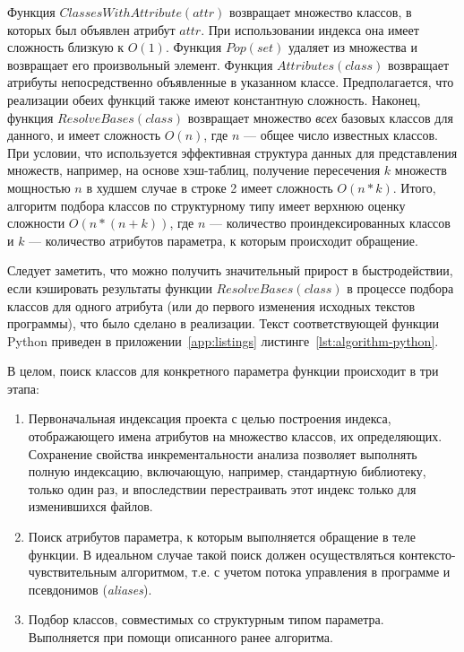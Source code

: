 Функция $ClassesWithAttribute(attr)$ возвращает множество классов, в
которых был объявлен атрибут $attr$. При использовании индекса она
имеет сложность близкую к $O(1)$. Функция $Pop(set)$ удаляет из множества
и возвращает его произвольный элемент. Функция $Attributes(class)$ возвращает
атрибуты непосредственно объявленные в указанном классе. Предполагается, что
реализации обеих функций также имеют константную сложность. Наконец, функция
$ResolveBases(class)$ возвращает множество \emph{всех} базовых классов для
данного, и имеет сложность $O(n)$, где $n$ --- общее число известных классов.
При условии, что используется эффективная структура данных для представления
множеств, например, на основе хэш-таблиц, получение пересечения $k$ множеств
мощностью $n$ в худшем случае в строке 2 имеет сложность $O(n*k)$.  Итого,
алгоритм подбора классов по структурному типу имеет верхнюю оценку сложности
$O(n* (n + k))$, где $n$ --- количество проиндексированных классов и $k$ ---
количество атрибутов параметра, к которым происходит обращение.

Следует заметить, что можно получить значительный прирост в быстродействии, если
кэшировать результаты функции $ResolveBases(class)$ в процессе подбора классов
для одного атрибута (или до первого изменения исходных текстов программы), что
было сделано в реализации. Текст соответствующей функции Python приведен в
приложении~\ref{app:listings} листинге~\ref{lst:algorithm-python}.


В целом, поиск классов для конкретного параметра функции происходит в три этапа:

\begin{enumerate}
  \item Первоначальная индексация проекта с целью построения
    индекса, отображающего имена атрибутов на множество классов, их определяющих.
    Сохранение свойства инкрементальности анализа позволяет выполнять полную
    индексацию, включающую, например, стандартную библиотеку, только один раз,
    и впоследствии перестраивать этот индекс только для изменившихся файлов.

  \item Поиск атрибутов параметра, к которым выполняется обращение в теле
    функции. В идеальном случае такой поиск должен осуществляться
    контексто-чувствительным алгоритмом, т.е. с учетом потока управления в
    программе и псевдонимов (\emph{aliases}).

  \item Подбор классов, совместимых со структурным типом параметра.
    Выполняется при помощи описанного ранее алгоритма.

\end{enumerate}


